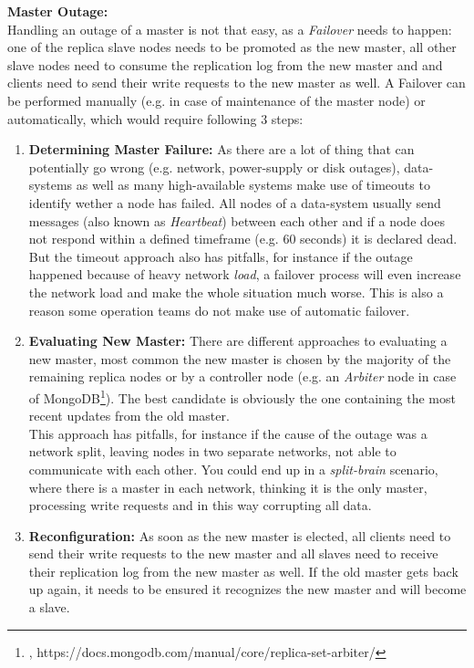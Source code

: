 {\textbf{Master Outage:}\\
Handling an outage of a master is not that easy, as a \textit{Failover} needs to happen: one of the replica slave nodes needs to be promoted as the new master, all other slave nodes need to consume the replication log from the new master and and clients need to send their write requests to the new master as well. A Failover can be performed manually (e.g. in case of maintenance of the master node) or automatically, which would require following 3 steps:\\

\begin{enumerate}
\item \textbf{Determining Master Failure:} As there are a lot of thing that can potentially go wrong (e.g. network, power-supply or disk outages), data-systems as well as many high-available systems make use of timeouts to identify wether a node has failed. All nodes of a data-system usually send messages (also known as \textit{Heartbeat}) between each other and if a node does not respond within a defined timeframe (e.g. 60 seconds) it is declared dead. \\
But the timeout approach also has pitfalls, for instance if the outage happened because of heavy network \textit{load}, a failover process will even increase the network load and make the whole situation much worse. This is also a reason some operation teams do not make use of automatic failover.
\item \textbf{Evaluating New Master:} There are different approaches to evaluating a new master, most common the new master is chosen by the majority of the remaining replica nodes or by a controller node (e.g. an \textit{Arbiter} node in case of MongoDB\footnote{\cite{MDBARB}, https://docs.mongodb.com/manual/core/replica-set-arbiter/}). The best candidate is obviously the one containing the most recent updates from the old master.\\
This approach has pitfalls, for instance if the cause of the outage was a network split, leaving nodes in two separate networks, not able to communicate with each other. You could end up in a \textit{split-brain} scenario, where there is a master in each network, thinking it is the only master, processing write requests and in this way corrupting all data.
\item \textbf{Reconfiguration:} As soon as the new master is elected, all clients need to send their write requests to the new master and all slaves need to receive their replication log from the new master as well. If the old master gets back up again, it needs to be ensured it recognizes the new master and will become a slave.
\end{enumerate}

}
